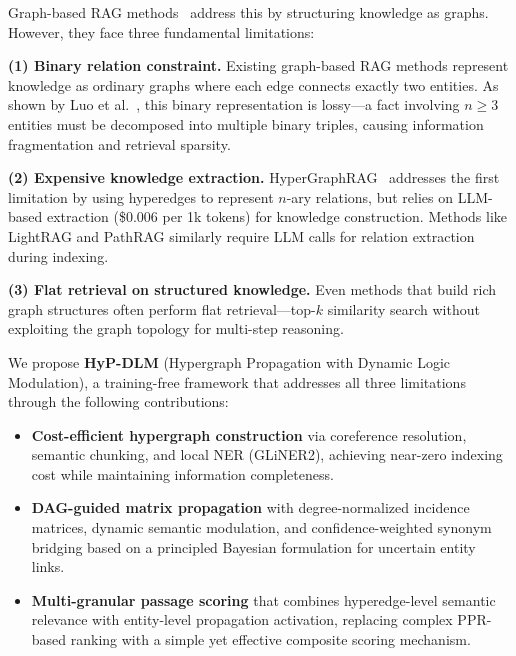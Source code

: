 \documentclass[11pt,a4paper]{article}
\begin{document}
Graph-based RAG methods~\cite{edge2024graphrag,guo2025lightrag,chen2025pathrag,gutierrez2025hipporag2} address this by structuring knowledge as graphs. However, they face three fundamental limitations:

\textbf{(1) Binary relation constraint.} Existing graph-based RAG methods represent knowledge as ordinary graphs where each edge connects exactly two entities. As shown by Luo et al.~\cite{luo2025hypergraphrag}, this binary representation is lossy---a fact involving $n \geq 3$ entities must be decomposed into multiple binary triples, causing information fragmentation and retrieval sparsity.

\textbf{(2) Expensive knowledge extraction.} HyperGraphRAG~\cite{luo2025hypergraphrag} addresses the first limitation by using hyperedges to represent $n$-ary relations, but relies on LLM-based extraction (\$0.006 per 1k tokens) for knowledge construction. Methods like LightRAG and PathRAG similarly require LLM calls for relation extraction during indexing.

\textbf{(3) Flat retrieval on structured knowledge.} Even methods that build rich graph structures often perform flat retrieval---top-$k$ similarity search without exploiting the graph topology for multi-step reasoning.

We propose \textbf{HyP-DLM} (Hypergraph Propagation with Dynamic Logic Modulation), a training-free framework that addresses all three limitations through the following contributions:

\begin{itemize}[leftmargin=*]
    \item \textbf{Cost-efficient hypergraph construction} via coreference resolution, semantic chunking, and local NER (GLiNER2), achieving near-zero indexing cost while maintaining information completeness.
    \item \textbf{DAG-guided matrix propagation} with degree-normalized incidence matrices, dynamic semantic modulation, and confidence-weighted synonym bridging based on a principled Bayesian formulation for uncertain entity links.
    \item \textbf{Multi-granular passage scoring} that combines hyperedge-level semantic relevance with entity-level propagation activation, replacing complex PPR-based ranking with a simple yet effective composite scoring mechanism.
\end{itemize}


\end{document}
